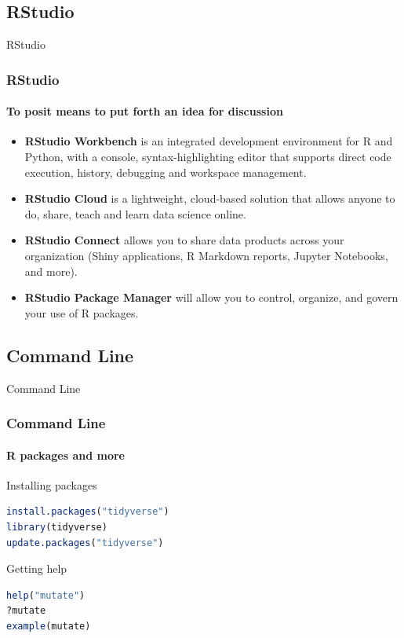 \documentclass[
	11pt, %
]{beamer}
\begin{document}
\subsection{RStudio}
\begin{frame}[fragile]{RStudio}
	\frametitle{RStudio}
	\framesubtitle{To posit means to put forth an idea for discussion} %
    \begin{block}{}
	\begin{itemize}
\small
\item \textbf{RStudio Workbench} is an integrated development environment for R and Python, with a console, syntax-highlighting editor that supports direct code execution, history, debugging and workspace management. 

\item \textbf{RStudio Cloud} is a lightweight, cloud-based solution that allows anyone to do, share, teach and learn data science online.

\item \textbf{RStudio Connect} allows you to share data products across your organization (Shiny applications, R Markdown reports, Jupyter Notebooks, and more).

\item \textbf{RStudio Package Manager} will allow you to control, organize, and govern your use of R packages.



\end{itemize}

	\end{block}
	
	\end{frame}
	



\subsection{Command Line}
\begin{frame}[fragile]{Command Line}
	\frametitle{Command Line}
	\framesubtitle{R packages and more} %

	\begin{block}{Installing packages}
\begin{lstlisting}[language=R]
install.packages("tidyverse")
library(tidyverse)
update.packages("tidyverse")
\end{lstlisting}
     \vskip0pt 
	\end{block}
		\begin{block}{Getting help}
\begin{lstlisting}[language=R]
help("mutate")
?mutate
example(mutate)
\end{lstlisting}
     \vskip0pt 
	\end{block}

\end{frame}
\end{document}
